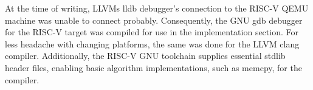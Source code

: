 At the time of writing, LLVMs lldb debugger's connection to the RISC-V QEMU
machine was unable to connect probably. Consequently, the GNU gdb debugger for
the RISC-V target was compiled for use in the implementation section. For less
headache with changing platforms, the same was done for the LLVM clang compiler.
Additionally, the RISC-V GNU toolchain supplies essential stdlib header files,
enabling basic algorithm implementations, such as memcpy, for the compiler.

